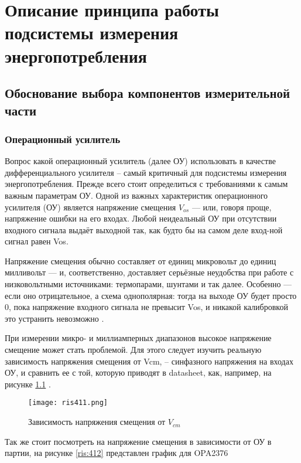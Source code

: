 \chapter{Описание принципа работы подсистемы измерения энергопотребления}
\section{Обоснование выбора компонентов измерительной части}
\subsection{Операционный усилитель}
\hspace{1cm} 

Вопрос какой операционный усилитель (далее ОУ) использовать в качестве дифференциального усилителя -- самый 
критичный для подсистемы измерения энергопотребления. Прежде всего стоит определиться с требованиями к 
самым важным параметрам ОУ. 
Одной из важных характеристик операционного усилителя (ОУ) является напряжение смещения $V_{os}$ — или, 
говоря проще, напряжение ошибки на его входах. Любой неидеальный ОУ при отсутствии входного сигнала выдаёт 
выходной так, как будто бы на самом деле вход-ной сигнал равен Vos.

Напряжение смещения обычно составляет от единиц микровольт до единиц милливольт — и, соответственно, 
доставляет серьёзные неудобства при работе с низковольтными источниками: термопарами, шунтами и так далее.
Особенно — если оно отрицательное, а схема однополярная: тогда на выходе ОУ будет просто 0, пока 
напряжение входного сигнала не превысит Vos, и никакой калибровкой это устранить невозможно \cite{Chopper:OU} 
\cite{MT-037:Tutorial}. 

При измерении микро- и миллиамперных диапазонов высокое напряжение смещение может стать проблемой.
Для этого следует изучить реальную зависимость напряжения смещения от Vcm, -- синфазного
напряжения на входах ОУ, и сравнить ее с той, 
которую приводят в datasheet, как, например, на рисунке \ref{ris:411} \cite{OPAx376:datasheet}.
\begin{figure}[H]
\centering
\texttt{[image: ris411.png]}
\caption{Зависимость напряжения смещения от $V_{cm}$}
\label{ris:411}
\end{figure}

Так же стоит посмотреть на напряжение смещения в зависимости от ОУ в партии, 
на рисунке \ref{ris:412} представлен график для OPA2376 \cite{OPAx376:datasheet}

